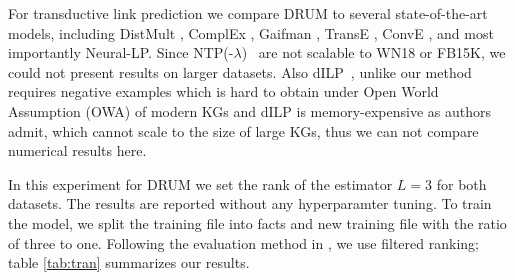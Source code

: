\documentclass{article}
\begin{document}
For transductive link prediction we compare DRUM to several state-of-the-art models, including DistMult \citep{Yang2015EmbeddingEA}, ComplEx \citep{pmlr-v48-trouillon16}, Gaifman \citep{Niepert:2016:DGM:3157382.3157479}, TransE \citep{bordes2013translating}, ConvE
\citep{dettmers2018convolutional}, and most importantly Neural-LP. Since NTP(-$\lambda$)~\cite{rocktaschel2017end} are not scalable to WN18 or FB15K, we could not present results on larger datasets. Also dILP~\cite{evans2018learning}, unlike our method requires negative examples which is hard to obtain under Open World Assumption (OWA) of modern KGs and dILP is memory-expensive as authors admit, which cannot scale to the size of large KGs, thus we can not compare numerical results here.

In this experiment for DRUM we set the rank of the estimator $L=3$ for both datasets. The results are reported without any hyperparamter tuning. To train the model, we split the training file into facts and new training file with the ratio of three to one. Following the evaluation method in \citet{bordes2013translating}, we use filtered ranking; table \ref{tab:tran} summarizes our results. 
\end{document}
